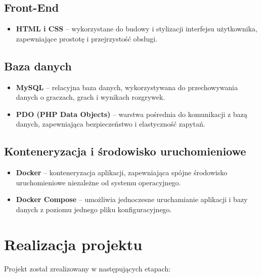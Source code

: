 \documentclass[12pt,a4paper]{article}
\begin{document}
\subsection{Front-End}
\begin{itemize}
    \item \textbf{HTML i CSS} – wykorzystane do budowy i stylizacji interfejsu użytkownika, zapewniające prostotę i przejrzystość obsługi.
\end{itemize}

\subsection{Baza danych}
\begin{itemize}
    \item \textbf{MySQL} – relacyjna baza danych, wykorzystywana do przechowywania danych o graczach, grach i wynikach rozgrywek.
    \item \textbf{PDO (PHP Data Objects)} – warstwa pośrednia do komunikacji z bazą danych, zapewniająca bezpieczeństwo i elastyczność zapytań.
\end{itemize}

\subsection{Konteneryzacja i środowisko uruchomieniowe}
\begin{itemize}
    \item \textbf{Docker} – konteneryzacja aplikacji, zapewniająca spójne środowisko uruchomieniowe niezależne od systemu operacyjnego.
    \item \textbf{Docker Compose} – umożliwia jednoczesne uruchamianie aplikacji i bazy danych z poziomu jednego pliku konfiguracyjnego.
\end{itemize}


\section{Realizacja projektu}
Projekt został zrealizowany w następujących etapach:
\end{document}
